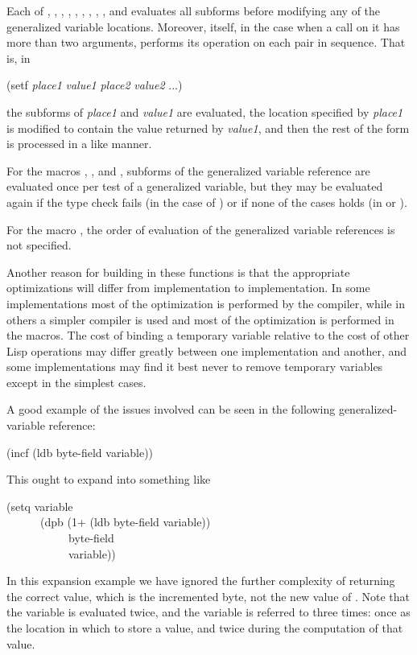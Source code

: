 \begin{newer}
Each of
, , , , , ,
, , , and  evaluates
all subforms before modifying any of the generalized variable locations.  Moreover,
 itself,
in the case when a call on it has more than two arguments, performs its
operation on each pair in sequence.  That is, in
\begin{lisp}
(setf \textit{place1} \textit{value1} \textit{place2} \textit{value2} ...)
\end{lisp}
the subforms of \textit{place1} and \textit{value1} are evaluated, the
location specified by \textit{place1} is modified to contain the value returned by
\textit{value1}, and then the rest of the  form is processed in a like manner.

For the macros , , and , subforms of the
generalized variable reference are evaluated once per test of a generalized
variable, but they may be
evaluated again if the type check fails (in the case of ) or if none of
the cases holds (in  or ).

For the macro , the order of evaluation of the generalized variable
references is not specified.
\end{newer}

Another reason for building in these functions is that the
appropriate optimizations will differ from implementation to
implementation.  In some implementations most of the optimization is
performed by the compiler, while in others a simpler compiler is used and
most of the optimization is performed in the macros.  The cost of
binding a temporary variable relative to the cost of other Lisp
operations may differ greatly between one implementation
and another, and some implementations may find it
best never to remove temporary variables except in the simplest cases.

A good example of the issues involved can be seen in the following
generalized-variable reference:
\begin{lisp}
(incf (ldb byte-field variable))
\end{lisp}
This ought to expand into something like
\begin{lisp}
(setq variable \\
~~~~~~(dpb (1+ (ldb byte-field variable)) \\
~~~~~~~~~~~byte-field \\
~~~~~~~~~~~variable))
\end{lisp}
In this expansion example we have
ignored the further complexity of returning the correct
value, which is the incremented byte, not the new value of .
Note that the variable  is evaluated twice, and the
variable  is referred to three times:
once as the location in which to store a value,
and twice during the computation of that value.

